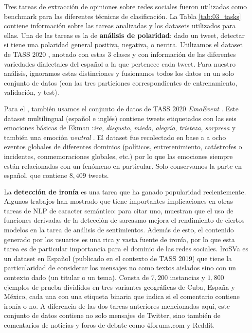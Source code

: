 Tres tareas de extracción de opiniones sobre redes sociales fueron utilizadas como benchmark para las diferentes técnicas de clasificación. La Tabla \ref{tab:03_tasks} contiene información sobre las tareas analizadas y los datasets utilizados para ellas. Una de las tareas es la de \textbf{análisis de polaridad}: dado un tweet, detectar si tiene una polaridad general positiva, negativa, o neutra. Utilizamos el dataset de TASS 2020 \cite{garcia2020overview}, anotado con estas 3 clases y con información de las diferentes variedades dialectales del español a la que pertenece cada tweet. Para nuestro análisis, ignoramos estas distinciones y fusionamos todos los datos en un solo conjunto de datos (con las tres particiones correspondientes de entrenamiento, validación, y test).

Para el , también usamos el conjunto de datos de TASS 2020 \emph{EmoEvent} \cite{plaza-del-arco-etal-2020-emoevent}. Este dataset multilingual (español e inglés) contiene tweets etiquetados con las seis emociones básicas de Ekman :\emph {ira}, \emph {disgusto}, \emph {miedo}, \emph {alegría}, \emph {tristeza}, \emph {sorpresa} y también una emoción \emph{neutral} \cite{ekman1992argument}. El dataset fue recolectado en base a a ocho eventos globales de diferentes dominios (políticos, entretenimiento, catástrofes o incidentes, conmemoraciones globales, etc.) por lo que las emociones siempre están relacionadas con un fenómeno en particular. Solo conservamos la parte en español, que contiene $8,409$ tweets.


 La \textbf{detección de ironía} es una tarea que ha ganado popularidad recientemente. Algunos trabajos han mostrado que tiene importantes implicaciones en otras tareas de NLP de caracter semántico: para citar uno, \citet{gupta-yang-2017-crystalnest} muestran que el uso de funciones derivadas de la detección de sarcasmo mejora el rendimiento de ciertos modelos en la tarea de análisis de sentimientos. Además de esto, el contenido generado por los usuarios es una rica y vasta fuente de ironía, por lo que esta tarea es de particular importancia para el dominio de las redes sociales. IroSVa \cite {ortega2019overview} es un dataset en Español (publicado en el contexto de TASS 2019) que tiene la particularidad de considerar los mensajes no como textos aislados sino con un contexto dado (un titular o un tema). Consta de $7,200$ instancias y $1,800$ ejemplos de prueba divididos en tres variantes geográficas de Cuba, España y México, cada una con una etiqueta binaria que indica si el comentario contiene ironía o no. A diferencia de las dos tareas anteriores mencionadas aquí, este conjunto de datos contiene no solo mensajes de Twitter, sino también de comentarios de noticias y foros de debate como 4forums.com y Reddit.

